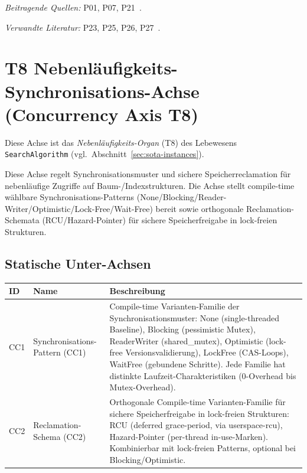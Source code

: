 \emph{Beitragende Quellen:} P01, P07, P21~\cite{leis2013art,wu2019wormhole,chen2001prefetch}.

\emph{Verwandte Literatur:} P23, P25, P26, P27~\cite{khan2010adaptive,mahling2025hotpath,zhang2024pathprefix,zhang2025hierarchical}.

\section[head={T8 Nebenläufigkeits-Synchronisations-Achse (Concurrency Axis)}]{T8 Nebenläufigkeits-Synchronisations-Achse (Concurrency Axis T8)}

Diese Achse ist das \emph{Nebenläufigkeits-Organ} (T8) des Lebewesens \texttt{SearchAlgorithm} (vgl.\ Abschnitt~\ref{sec:sota-instances}).

Diese Achse regelt Synchronisationsmuster und sichere Speicherreclamation für nebenläufige Zugriffe auf Baum-/\allowbreak{}Indexstrukturen. Die Achse stellt compile-time wählbare Synchronisations-Patterns (None/\allowbreak{}Blocking/\allowbreak{}Reader-Writer/\allowbreak{}Optimistic/\allowbreak{}Lock-Free/\allowbreak{}Wait-Free) bereit sowie orthogonale Reclamation-Schemata (RCU/\allowbreak{}Hazard-Pointer) für sichere Speicherfreigabe in lock-freien Strukturen.

\subsection*{Statische Unter-Achsen}

\begin{scriptsize}
\begin{longtable}{@{}>{\raggedright\arraybackslash}p{1.8cm} >{\raggedright\arraybackslash}p{3.2cm} >{\raggedright\arraybackslash}p{8.5cm}@{}}
\toprule
ID & Name & Beschreibung \\
\midrule
\endhead%
CC1 & Synchronisations-Pattern (CC1) & Compile-time Varianten-Familie der Synchronisationsmuster: None (single-threaded Baseline), Blocking (pessimistic Mutex), Reader\allowbreak{}Writer (shared\_\allowbreak{}mutex), Optimistic (lock-free Versionsvalidierung), Lock\allowbreak{}Free (CAS-Loops), Wait\allowbreak{}Free (gebundene Schritte). Jede Familie hat distinkte Laufzeit-Charakteristiken (0-Overhead bis Mutex-Overhead). \\
CC2 & Reclamation-Schema (CC2) & Orthogonale Compile-time Varianten-Familie für sichere Speicherfreigabe in lock-freien Strukturen: RCU (deferred grace-period, via userspace-rcu), Hazard-Pointer (per-thread in-use-Marken). Kombinierbar mit lock-freien Patterns, optional bei Blocking/\allowbreak{}Optimistic. \\
\bottomrule
\end{longtable}
\end{scriptsize}

